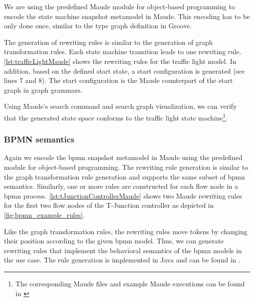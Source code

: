 \documentclass{jot}
\begin{document}
We are using the predefined Maude module for object-based programming to encode the state machine snapshot metamodel in Maude.
This encoding has to be only done once, similar to the type graph definition in Groove.

The generation of rewriting rules is similar to the generation of graph transformation rules.
Each state machine transition leads to one rewriting rule.
\autoref{lst:trafficLightMaude} shows the rewriting rules for the traffic light model.
In addition, based on the defined start state, a start configuration is generated (see lines 7 and 8).
The start configuration is the Maude counterpart of the start graph in graph grammars.



Using Maude's search command and search graph visualization, we can verify that the generated state space conforms to the traffic light state machine\footnote{\label{footnote:maudeArtifacts}The corresponding Maude files and example Maude executions can be found in \cite{krauterArtifactsBehavioralConsistency2022}}.

\subsubsection{BPMN semantics}
Again we encode the \gls*{bpmn} snapshot metamodel in Maude using the predefined module for object-based programming.
The rewriting rule generation is similar to the graph transformation rule generation and supports the same subset of \gls*{bpmn} semantics.
Similarly, one or more rules are constructed for each flow node in a \gls*{bpmn} process.
\autoref{lst:tJunctionControllerMaude} shows two Maude rewriting rules for the first two flow nodes of the T-Junction controller as depicted in \autoref{fig:bpmn_example_rules}.



Like the graph transformation rules, the rewriting rules move tokens by changing their position according to the given \gls*{bpmn} model.
Thus, we can generate rewriting rules that implement the behavioral semantics of the \gls*{bpmn} models in the use case.
The rule generation is implemented in Java and can be found in \cite{krauterRewriteRuleGeneration2022}.
\end{document}
